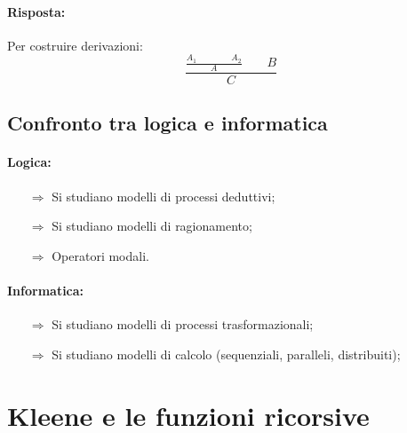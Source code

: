 \paragraph{Risposta:} Per costruire derivazioni: $$\frac{\frac{
    A_1 \:\:\:\:\:\:\:\:\:\:\:\:\:\:\:\:\:\: A_2}{A}\:\:\:\:\:\:\:\:\: B}{C}$$


\subsection{Confronto tra logica e informatica}

\paragraph{Logica:}

\begin{itemize}
    \item [$\Rightarrow$] Si studiano modelli di processi deduttivi;
    \item [$\Rightarrow$] Si studiano modelli di ragionamento;
    \item [$\Rightarrow$] Operatori modali.
\end{itemize}

\paragraph{Informatica:}

\begin{itemize}
    \item [$\Rightarrow$] Si studiano modelli di processi trasformazionali;
    \item [$\Rightarrow$] Si studiano modelli di calcolo (sequenziali, paralleli, distribuiti);
\end{itemize}


\section{Kleene e le funzioni ricorsive}

